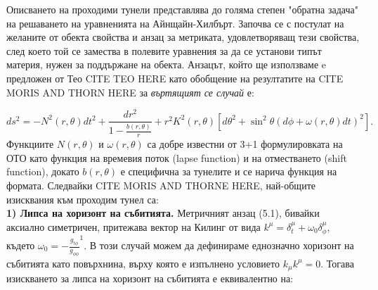 Описването на проходими тунели представлява до голяма степен "обратна задача"$\,$ на решаването на уравненията на Айнщайн-Хилбърт. Започва се с постулат на желаните от обекта свойства и анзац за метриката, удовлетворяващ тези свойства, след което той се замества в полевите уравнения за да се установи типът материя, нужен за поддържане на обекта. Анзацът, който ще използваме e предложен от Тео CITE TEO HERE като обобщение на резултатите на CITE MORIS AND THORN HERE за \emph{въртящият се случай} е:
 \setlength{\footskip}{0pt}
	
\begin{equation}
	ds^2 = -N^2(r,\theta)dt^2 + \frac{dr^2}{1 - \frac{b(r,\theta)}{r}} + r^2K^2(r,\theta)\left[d\theta^2 + \sin^2\theta\left(d\phi + \omega(r,\theta)dt\right)^2\right].
\end{equation}
Функциите $N(r,\theta)$ и $\omega(r,\theta)$ са добре известни от 3+1 формулировката на ОТО като функция на времевия поток (lapse function) и на отместването (shift function), докато $b(r,\theta)$ е специфична за тунелите и се нарича функция на формата. Следвайки CITE MORIS AND THORNE HERE, най-общите изисквания към проходим тунел са:\\

\textbf{1) Липса на хоризонт на събитията.} Метричният анзац (5.1), бивайки аксиално симетричен, притежава вектор на Килинг от вида $k^\mu = \delta_t^\mu + \omega_0\delta^\mu_\phi$, където $\omega_0 = -\frac{g_{t\phi}}{g_{\phi\phi}}^1$. В този случай можем да дефинираме еднозначно хоризонт на събитията като повърхнина, върху която е изпълнено условието $k_\mu k^\mu = 0$. Тогава изискването за липса на хоризонт на събитията е еквивалентно на:

